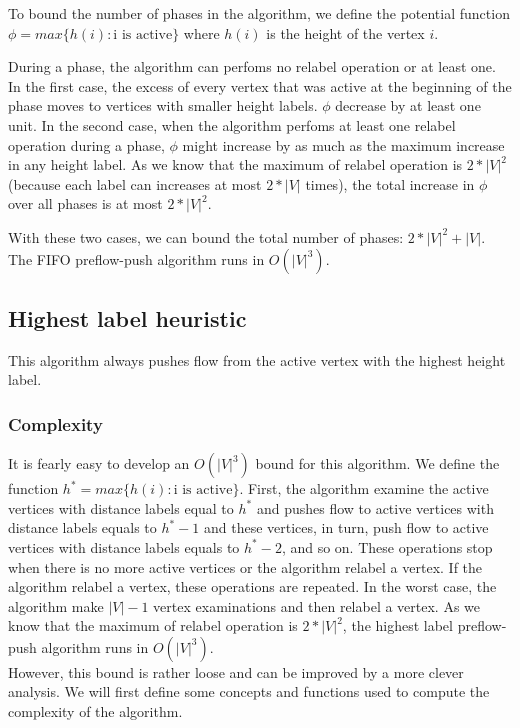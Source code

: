 To bound the number of phases in the algorithm, we define the potential function $\phi = max\{h(i) : \text{i is active}\}$ where $h(i)$ is the height of the vertex $i$.

During a phase, the algorithm can perfoms no relabel operation or at least one. In the first case, the excess of every vertex that was active at the beginning of the phase moves to vertices with smaller height labels. $\phi$ decrease by at least one unit. In the second case, when the algorithm perfoms at least one relabel operation during a phase, $\phi$ might increase by as much as the maximum increase in any height label. As we know that the maximum of relabel operation is $2*|V|^2$ (because each label can increases at most $2*|V|$ times), the total increase in $\phi$ over all phases is at most $2*|V|^2$.

With these two cases, we can bound the total number of phases: $2*|V|^2 + |V|$. The FIFO preflow-push algorithm runs in $O(|V|^3)$.

\subsection{Highest label heuristic}

This algorithm always pushes flow from the active vertex with the highest height label. 

\subsubsection{Complexity}

It is fearly easy to develop an $O(|V|^3)$ bound for this algorithm. We define the function $h^{*} = max\{h(i): \text{i is active}\}$. First, the algorithm examine the active vertices with distance labels equal to $h^{*}$ and pushes flow to active vertices with distance labels equals to $h^{*}-1$ and these vertices, in turn, push flow to active vertices with distance labels equals to $h^{*}-2$, and so on. These operations stop when there is no more active vertices or the algorithm relabel a vertex. If the algorithm relabel a vertex, these operations are repeated. In the worst case, the algorithm make $|V| - 1$ vertex examinations and then relabel a vertex. As we know that the maximum of relabel operation is $2*|V|^2$, the highest label preflow-push algorithm runs in $O(|V|^3)$.\\

However, this bound is rather loose and can be improved by a more clever analysis. We will first define some concepts and functions used to compute the complexity of the algorithm.\\

